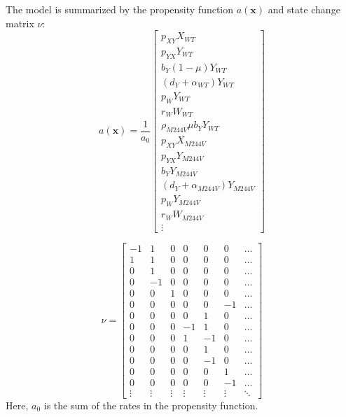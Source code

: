\documentclass{article}
\begin{document}
The model is summarized by the propensity function $a(\mathbf{x})$ and state change matrix $\nu$:
\begin{equation}
a(\mathbf{x}) = \frac{1}{a_0}
\begin{bmatrix}
p_{XY} X_{WT} \\
p_{YX} Y_{WT} \\ 
b_Y(1-\mu)Y_{WT} \\ 
(d_Y + \alpha_{WT})Y_{WT} \\
p_W Y_{WT} \\
r_W W_{WT} \\
\rho_{M244V}\mu b_Y Y_{WT} \\
p_{XY} X_{M244V} \\
p_{YX} Y_{M244V} \\ 
b_YY_{M244V} \\ 
(d_Y + \alpha_{M244V})Y_{M244V} \\
p_W Y_{M244V} \\
r_W W_{M244V} \\
\vdots
\end{bmatrix}
\end{equation}

\begin{equation}
\nu = 
\begin{bmatrix}
-1 & 1 & 0 & 0 & 0 & 0 & \dots \\
1 & 1 & 0 & 0 & 0 & 0 & \dots \\
0 & 1 & 0 & 0 & 0 & 0 & \dots \\
0 & -1 & 0 & 0 & 0 & 0 & \dots \\
0 & 0 & 1 & 0 & 0 & 0 & \dots \\
0 & 0 & 0 & 0 & 0 & -1 & \dots \\
0 & 0 & 0 & 0 & 1 & 0 & \dots \\
0 & 0 & 0 & -1 & 1 & 0 & \dots \\
0 & 0 & 0 & 1 & -1 & 0 & \dots \\
0 & 0 & 0 & 0 & 1 & 0 & \dots \\
0 & 0 & 0 & 0 & -1 & 0 & \dots \\
0 & 0 & 0 & 0 & 0 & 1 & \dots \\
0 & 0 & 0 & 0 & 0 & -1 & \dots \\
\vdots & \vdots & \vdots & \vdots & \vdots & \vdots & \ddots
\end{bmatrix}
\end{equation}
Here, $a_0$ is the sum of the rates in the propensity function.
\end{document}
